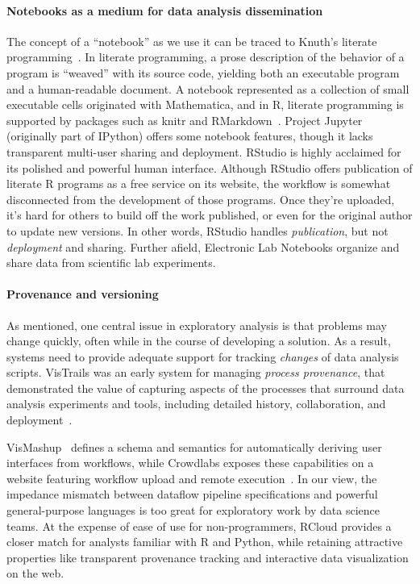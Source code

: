 \paragraph*{Notebooks as a medium for data analysis dissemination}
The concept of a ``notebook'' as we use it can be traced
to Knuth's literate programming~\cite{Knuth:1984:LP}.
In literate programming, a prose description of the behavior of
a program is ``weaved'' with its source code, yielding both an
executable program and a human-readable document.
A notebook represented as a collection of small executable cells
originated with Mathematica, and in R, literate programming is
supported by packages such as knitr and RMarkdown~\cite{Xie:2013:DDW}.
Project Jupyter~\cite{jupyter} (originally part of
IPython) offers some notebook features, though it lacks transparent
multi-user sharing and deployment.
RStudio is highly acclaimed for its polished and powerful human interface.
Although RStudio offers publication of literate R programs as a free
service on its website, the workflow is somewhat disconnected from
the development of those programs. Once they're uploaded, it's hard
for others to build off the work published, or even for the
original author to update new versions. In other words, RStudio
handles \emph{publication}, but not \emph{deployment} and sharing.
%
Further afield, {Electronic Lab Notebooks} organize
and share data from scientific lab experiments\cite{Rubacha:2011:ELN}.
%

\paragraph*{Provenance and versioning} As
mentioned, one central issue in exploratory analysis is that
problems may change quickly, often while in the course of
developing a solution. As a result, systems need to provide adequate
support for tracking \emph{changes} of data analysis scripts. VisTrails
was an early system for managing \emph{process provenance},
that demonstrated the value of capturing aspects of the processes
that surround data analysis experiments and tools, including detailed
history, collaboration, and deployment~\cite{Callahan:2006:VVM}.

VisMashup~\cite{Santos:2009:VST} defines a schema and
semantics for automatically deriving user interfaces from workflows,
while Crowdlabs exposes these capabilities on a website
featuring workflow upload and remote execution~\cite{Mates:2011:CSA}.
In our view, the impedance mismatch between dataflow pipeline
specifications and powerful general-purpose languages is too great
for exploratory work by data science teams. At the
expense of ease of use for non-programmers, RCloud provides
a closer match for analysts familiar with R and Python,
while retaining attractive properties like transparent
provenance tracking and interactive data visualization on the web.

